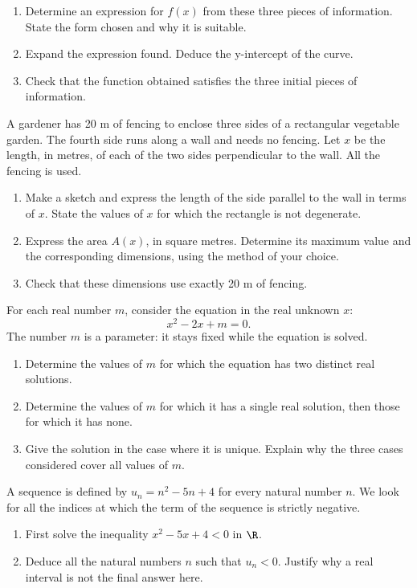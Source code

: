 \begin{enumerate}[label=\arabic*.]
\item Determine an expression for $f(x)$ from these three pieces of information. State the form chosen and why it is suitable.
\item Expand the expression found. Deduce the y-intercept of the curve.
\item Check that the function obtained satisfies the three initial pieces of information.
\end{enumerate}
A gardener has 20 m of fencing to enclose three sides of a rectangular vegetable garden. The fourth side runs along a wall and needs no fencing. Let $x$ be the length, in metres, of each of the two sides perpendicular to the wall. All the fencing is used.
\begin{enumerate}[label=\arabic*.]
\item Make a sketch and express the length of the side parallel to the wall in terms of $x$. State the values of $x$ for which the rectangle is not degenerate.
\item Express the area $A(x)$, in square metres. Determine its maximum value and the corresponding dimensions, using the method of your choice.
\item Check that these dimensions use exactly 20 m of fencing.
\end{enumerate}
For each real number $m$, consider the equation in the real unknown $x$:\[x^2-2x+m=0.\]The number $m$ is a parameter: it stays fixed while the equation is solved.
\begin{enumerate}[label=\arabic*.]
\item Determine the values of $m$ for which the equation has two distinct real solutions.
\item Determine the values of $m$ for which it has a single real solution, then those for which it has none.
\item Give the solution in the case where it is unique. Explain why the three cases considered cover all values of $m$.
\end{enumerate}
A sequence is defined by $u_n=n^2-5n+4$ for every natural number $n$. We look for all the indices at which the term of the sequence is strictly negative.
\begin{enumerate}[label=\arabic*.]
\item First solve the inequality $x^2-5x+4<0$ in $\R$.
\item Deduce all the natural numbers $n$ such that $u_n<0$. Justify why a real interval is not the final answer here.
\end{enumerate}
